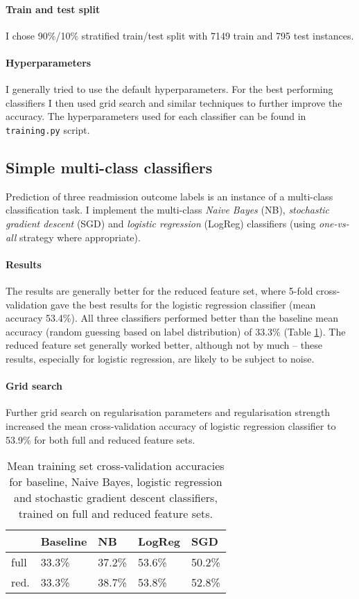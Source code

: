 \documentclass[10pt, twocolumn]{article}
\begin{document}
\paragraph{Train and test split} I chose 90\%/10\% stratified train/test split with 7149 train and 795 test instances.

\paragraph{Hyperparameters} I generally tried to use the default hyperparameters. For the best performing classifiers I then used grid search and similar techniques to further improve the accuracy. The hyperparameters used for each classifier can be found in \texttt{training.py} script.

\subsection{Simple multi-class classifiers}
Prediction of three readmission outcome labels is an instance of a multi-class classification task. I implement the multi-class \textit{Naive Bayes} (NB), \textit{stochastic gradient descent} (SGD) and \textit{logistic regression}  (LogReg) classifiers (using \textit{one-vs-all} strategy where appropriate).

\paragraph{Results} The results are generally better for the reduced feature set, where 5-fold cross-validation gave the best results for the logistic regression classifier (mean accuracy 53.4\%). All three classifiers performed better than the baseline mean accuracy (random guessing based on label distribution) of 33.3\% (Table \ref{multiclass}). The reduced feature set generally worked better, although not by much – these results, especially for logistic regression, are likely to be subject to noise.

\paragraph{Grid search} Further grid search on regularisation parameters and regularisation strength increased the mean cross-validation accuracy of logistic regression classifier to 53.9\% for both full and reduced feature sets.

\begin{table}[]
	\begin{tabularx}{\linewidth}{XXXXX}
		\hline
								 & \textbf{Baseline} & \textbf{NB} & \textbf{LogReg} & \textbf{SGD} \\ \hline
		full   & 33.3\%            & 37.2\%      & 53.6\%          & 50.2\%       \\
		red. & 33.3\%            & 38.7\%      & 53.8\%          & 52.8\%       \\ \hline
		\end{tabularx}
\caption{Mean training set cross-validation accuracies for baseline, Naive Bayes, logistic regression and stochastic gradient descent classifiers, trained on full and reduced feature sets.}\label{multiclass}
\end{table}
\end{document}
